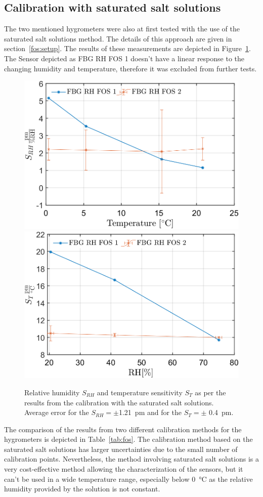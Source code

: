 \subsection{Calibration with saturated salt solutions}
The two mentioned hygrometers were also at first tested with the use of the saturated salt solutions method. The details of this approach are given in section~\ref{fos:setup}. The results of these measurements are depicted in Figure~\ref{fig:fos_salt}. The Sensor depicted as FBG RH FOS 1 doesn't have a linear response to the changing humidity and temperature, therefore it was excluded from further tests. 

\begin{figure}[!h]
\centering
\includegraphics[width=0.48\columnwidth]{Chapter5/images/salt_srh.png}
\includegraphics[width=0.49\columnwidth]{Chapter5/images/salt_st.png}
\caption{Relative humidity $S_{RH}$ and temperature sensitivity $S_{T}$ as per the results from the calibration with the saturated salt solutions. Average error for the $S_{RH} = \pm $\SI{1.21}{\pico\metre} and for the $S_{T}=\pm$ \SI{0.4}{\pico\metre}.}
\label{fig:fos_salt}
\end{figure}

The comparison of the results from two different calibration methods for the hygrometers is depicted in Table~\ref{tab:fos}. The calibration method based on the saturated salt solutions has larger uncertainties due to the small number of calibration points. Nevertheless, the method involving saturated salt solutions is a very cost-effective method allowing the characterization of the sensors, but it can't be used in a wide temperature range, especially below \SI{0}{\celsius} as the relative humidity provided by the solution is not constant. 

